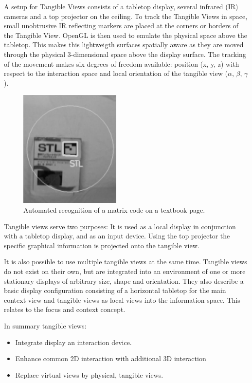 A setup for Tangible Views consists of a tabletop display, several infrared (IR) cameras and a top projector on the ceiling. To track the Tangible Views in space, small unobtrusive IR reflecting markers are placed at the corners or borders of the Tangible View. OpenGL is then used to emulate the physical space above the tabletop. This makes this lightweigth surfaces spatially aware as they are moved through the physical 3-dimensional space above the display surface. The tracking of the movement makes six degrees of freedom available: position (x, y, z) with respect to the interaction space and local orientation of the tangible view ($\alpha$, $\beta$, $\gamma$).
\begin{figure}
\centering
\includegraphics[width=0.45\textwidth]{figures/InteractiveTextbook4.jpg}
\caption{Automated recognition of a matrix code on a textbook page.}
\label{fig:textbook}
\end{figure}

Tangible views serve two purposes: It is used as a local display in conjunction with a tabletop display, and as an input device.
Using the top projector the specific graphical information is projected onto the tangible view.

It is also possible to use multiple tangible views at the same time. 
Tangible views do not exist on their own, but are integrated into an environment of one or more stationary displays of arbitrary size, shape and orientation. 
They also describe a basic display configuration consisting of a horizontal tabletop for the main context view and tangible views as local views into the information space. This relates to the focus and context concept.

In summary tangible views:
\begin{itemize}
\item Integrate display an interaction device.
\item Enhance common 2D interaction with additional 3D interaction
\item Replace virtual views by physical, tangible views.
\end{itemize}

